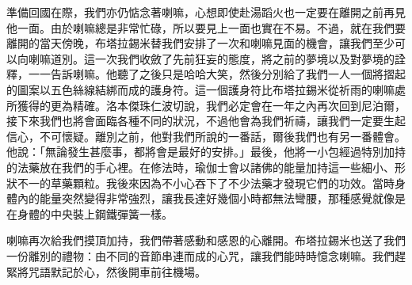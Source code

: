 準備回國在際，我們亦仍惦念著喇嘛，心想即使赴湯蹈火也一定要在離開之前再見他一面。由於喇嘛總是非常忙碌，所以要見上一面也實在不易。不過，就在我們要離開的當天傍晚，布塔拉錫米替我們安排了一次和喇嘛見面的機會，讓我們至少可以向喇嘛道別。這一次我們收斂了先前狂妄的態度，將之前的夢境以及對夢境的詮釋，一一告訴喇嘛。他聽了之後只是哈哈大笑，然後分別給了我們一人一個將摺起的圖案以五色絲線結綁而成的護身符。這一個護身符比布塔拉錫米從祈雨的喇嘛處所獲得的更為精確。洛本傑珠仁波切說，我們必定會在一年之內再次回到尼泊爾，接下來我們也將會面臨各種不同的狀況，不過他會為我們祈禱，讓我們一定要生起信心，不可懷疑。離別之前，他對我們所說的一番話，爾後我們也有另一番體會。他說：「無論發生甚麼事，都將會是最好的安排。」最後，他將一小包經過特別加持的法藥放在我們的手心裡。在修法時，瑜伽士會以諸佛的能量加持這一些細小、形狀不一的草藥顆粒。我後來因為不小心吞下了不少法藥才發現它們的功效。當時身體內的能量突然變得非常強烈，讓我長達好幾個小時都無法彎腰，那種感覺就像是在身體的中央裝上鋼鐵彈簧一樣。

喇嘛再次給我們摸頂加持，我們帶著感動和感恩的心離開。布塔拉錫米也送了我們一份離別的禮物：由不同的音節串連而成的心咒，讓我們能時時憶念喇嘛。我們趕緊將咒語默記於心，然後開車前往機場。

